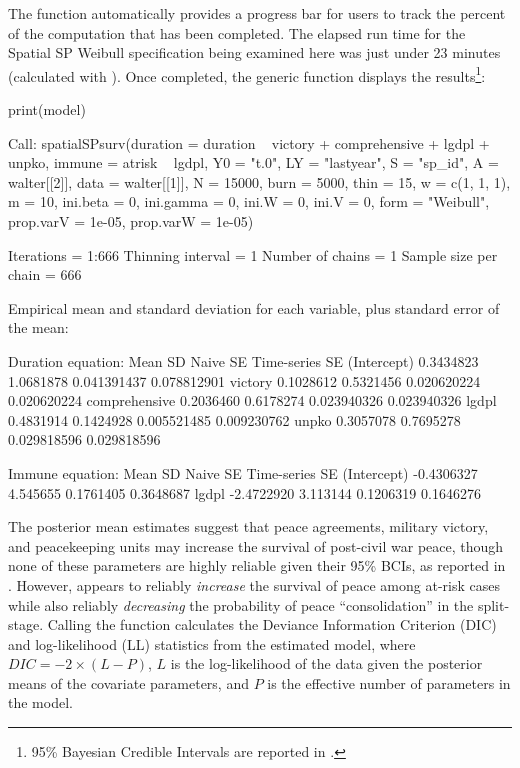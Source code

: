 \noindent The function automatically provides a progress bar for users to track the percent of the computation that has been completed. The elapsed run time for the Spatial SP Weibull specification being examined here was just under 23 minutes (calculated with ). Once completed, the generic  function displays the results\footnote{95\% Bayesian Credible Intervals are reported in \citet{Bolte2021}.}: 

\begin{example}
print(model)

Call:
spatialSPsurv(duration = duration ~ victory + comprehensive + 
    lgdpl + unpko, immune = atrisk ~ lgdpl, Y0 = "t.0", 
    LY = "lastyear", S = "sp_id", A = walter[[2]], 
    data = walter[[1]], N = 15000, burn = 5000, thin = 15, w = c(1, 
        1, 1), m = 10, ini.beta = 0, ini.gamma = 0, ini.W = 0, 
    ini.V = 0, form = "Weibull", prop.varV = 1e-05, prop.varW = 1e-05)


Iterations = 1:666
Thinning interval = 1 
Number of chains = 1 
Sample size per chain = 666 

Empirical mean and standard deviation for each variable,
plus standard error of the mean:


Duration equation: 
                   Mean        SD    Naive SE Time-series SE
(Intercept)   0.3434823 1.0681878 0.041391437    0.078812901
victory       0.1028612 0.5321456 0.020620224    0.020620224
comprehensive 0.2036460 0.6178274 0.023940326    0.023940326
lgdpl         0.4831914 0.1424928 0.005521485    0.009230762
unpko         0.3057078 0.7695278 0.029818596    0.029818596

Immune equation: 
                  Mean       SD  Naive SE Time-series SE
(Intercept) -0.4306327 4.545655 0.1761405      0.3648687
lgdpl       -2.4722920 3.113144 0.1206319      0.1646276
\end{example}



\noindent The posterior mean estimates suggest that peace agreements, military victory, and peacekeeping units may increase the survival of post-civil war peace, though none of these parameters are highly reliable given their 95\% BCIs, as reported in \citep{Bolte2021}. However,  appears to reliably \textit{increase} the survival of peace among at-risk cases while also reliably \textit{decreasing} the probability of peace ``consolidation'' in the split-stage. Calling the  function calculates the Deviance Information Criterion (DIC) and log-likelihood (LL) statistics from the estimated model, where 
$DIC = -2 \times (L-P)$, $L$ is the log-likelihood of the data given the posterior means of the covariate parameters, and $P$ is the effective number of parameters in the model.

